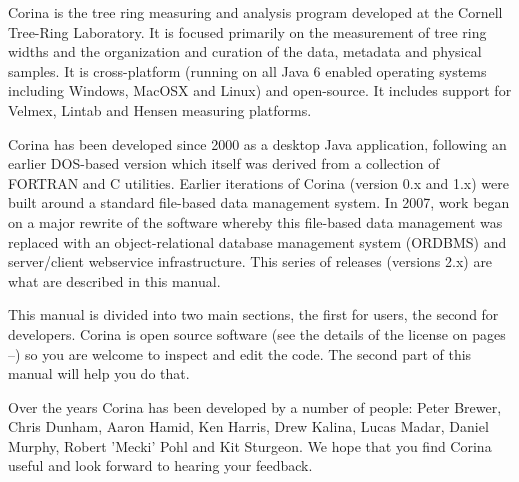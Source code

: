 Corina is the tree ring measuring and analysis program developed at the Cornell Tree-Ring Laboratory. It is focused primarily on the measurement of tree ring widths and the organization and curation of the data, metadata and physical samples. It is cross-platform (running on all Java 6 enabled operating systems including Windows, MacOSX and Linux) and open-source. It includes support for Velmex, Lintab and Hensen measuring platforms.

Corina has been developed since 2000 as a desktop Java application, following an earlier DOS-based version which itself was derived from a collection of FORTRAN and C utilities. Earlier iterations of Corina (version 0.x and 1.x) were built around a standard file-based data management system. In 2007, work began on a major rewrite of the software whereby this file-based data management was replaced with an object-relational database management system (ORDBMS) and server/client webservice infrastructure. This series of releases (versions 2.x) are what are described in this manual.

This manual is divided into two main sections, the first for users, the second for developers.  Corina is open source software (see the details of the license on pages \pageref{txt:licenseStart}--\pageref{txt:licenseEnd}) so you are welcome to inspect and edit the code.  The second part of this manual will help you do that.

Over the years Corina has been developed by a number of people: Peter Brewer, Chris Dunham, Aaron Hamid, Ken Harris, Drew Kalina, Lucas Madar, Daniel Murphy, Robert 'Mecki' Pohl and Kit Sturgeon.  We hope that you find Corina useful and look forward to hearing your feedback.




